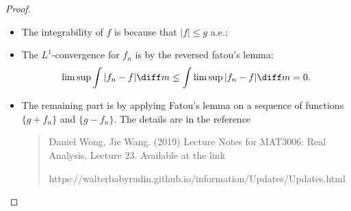 \begin{proof}
\begin{itemize}
\item
The integrability of $f$ is because that $|f|\le g$ a.e.;
\item
The $L^1$-convergence for $f_n$ is by the reversed fatou's lemma:
\[
\limsup\int|f_n-f|\diff m\le \int\limsup|f_n-f|\diff m=0.
\]
\item
The remaining part is by applying Fatou's lemma on a sequence of functions $\{g+f_n\}$ and $\{g-f_n\}$. The details are in the reference
\begin{quotation}
Daniel Wong, Jie Wang. (2019) Lecture Notes
for MAT3006: Real Analysis, Lecture 23. Available at
the link 

https://walterbabyrudin.github.io/information/Updates/Updates.html
\end{quotation}
\end{itemize}
\end{proof}















